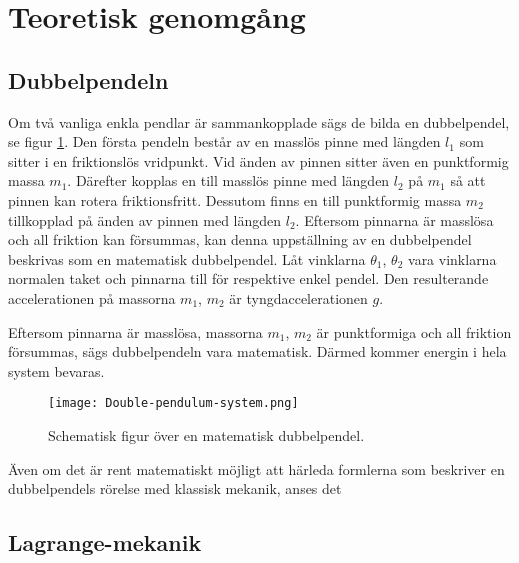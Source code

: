 \section{Teoretisk genomgång}
\subsection{Dubbelpendeln}
Om två vanliga enkla pendlar är sammankopplade sägs de bilda en dubbelpendel, se figur \ref{fig:double_pendulum_schematic}. Den första pendeln består av en masslös pinne med längden $l_1$ som sitter i en friktionslös vridpunkt. Vid änden av pinnen sitter även en punktformig massa $m_1$. Därefter kopplas en till masslös pinne med längden $l_2$ på $m_1$ så att pinnen kan rotera friktionsfritt. Dessutom finns en till punktformig massa $m_2$ tillkopplad på änden av pinnen med längden $l_2$. Eftersom pinnarna är masslösa och all friktion kan försummas, kan denna uppställning av en dubbelpendel beskrivas som en matematisk dubbelpendel. Låt vinklarna $\theta_1$, $\theta_2$ vara vinklarna normalen taket och pinnarna till för respektive enkel pendel. Den resulterande accelerationen på massorna $m_1$, $m_2$ är tyngdaccelerationen $g$.

Eftersom pinnarna är masslösa, massorna $m_1$, $m_2$ är punktformiga och all friktion försummas, sägs dubbelpendeln vara matematisk. Därmed kommer energin i hela system bevaras. 

\begin{figure}[h]
    \centering
    \texttt{[image: Double-pendulum-system.png]}
    \caption{Schematisk figur över en matematisk dubbelpendel.}
    \label{fig:double_pendulum_schematic}
\end{figure}




Även om det är rent matematiskt möjligt att härleda formlerna som beskriver en dubbelpendels rörelse med klassisk mekanik, anses det

\subsection{Lagrange-mekanik}

